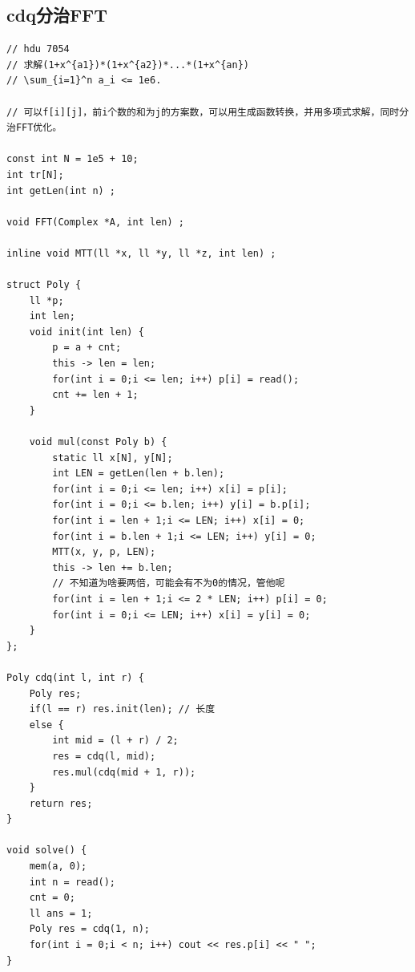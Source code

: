 \documentclass[twoside]{article}
\begin{document}
\subsection{cdq分治FFT}
\begin{lstlisting}
// hdu 7054
// 求解(1+x^{a1})*(1+x^{a2})*...*(1+x^{an})
// \sum_{i=1}^n a_i <= 1e6.

// 可以f[i][j]，前i个数的和为j的方案数，可以用生成函数转换，并用多项式求解，同时分治FFT优化。

const int N = 1e5 + 10;
int tr[N];
int getLen(int n) ;

void FFT(Complex *A, int len) ;

inline void MTT(ll *x, ll *y, ll *z, int len) ;

struct Poly {
    ll *p;
    int len;
    void init(int len) {
        p = a + cnt;
        this -> len = len;
        for(int i = 0;i <= len; i++) p[i] = read();
        cnt += len + 1;
    }

    void mul(const Poly b) {
        static ll x[N], y[N];
        int LEN = getLen(len + b.len);
        for(int i = 0;i <= len; i++) x[i] = p[i];
        for(int i = 0;i <= b.len; i++) y[i] = b.p[i];
        for(int i = len + 1;i <= LEN; i++) x[i] = 0;
        for(int i = b.len + 1;i <= LEN; i++) y[i] = 0;
        MTT(x, y, p, LEN);
        this -> len += b.len;
        // 不知道为啥要两倍，可能会有不为0的情况，管他呢
        for(int i = len + 1;i <= 2 * LEN; i++) p[i] = 0;
        for(int i = 0;i <= LEN; i++) x[i] = y[i] = 0;
    }
};

Poly cdq(int l, int r) {
    Poly res;
    if(l == r) res.init(len); // 长度
    else {
        int mid = (l + r) / 2;
        res = cdq(l, mid);
        res.mul(cdq(mid + 1, r));
    }
    return res;
}

void solve() {
    mem(a, 0);
    int n = read();
    cnt = 0;
    ll ans = 1;
    Poly res = cdq(1, n);
    for(int i = 0;i < n; i++) cout << res.p[i] << " ";
}\end{lstlisting}
\end{document}

